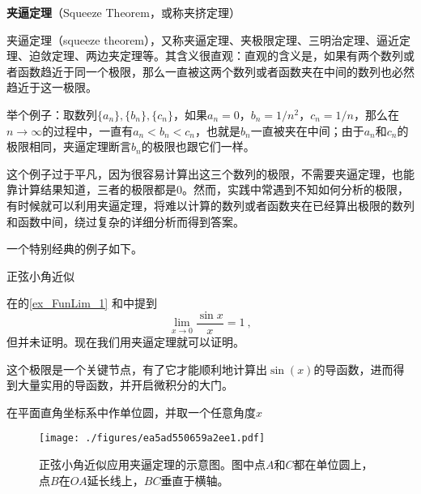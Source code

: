 
\begin{issues}
\issueDraft
\end{issues}
\textbf{夹逼定理}（Squeeze Theorem，或称夹挤定理）



夹逼定理（squeeze theorem），又称夹逼定理、夹极限定理、三明治定理、逼近定理、迫敛定理、两边夹定理等。其含义很直观：直观的含义是，如果有两个数列或者函数趋近于同一个极限，那么一直被这两个数列或者函数夹在中间的数列也必然趋近于这一极限。

举个例子：取数列$\{a_n\}, \{b_n\}, \{c_n\}$，如果$a_n=0$，$b_n=1/n^2$，$c_n=1/n$，那么在$n\to\infty$的过程中，一直有$a_n<b_n<c_n$，也就是$b_n$一直被夹在中间；由于$a_n$和$c_n$的极限相同，夹逼定理断言$b_n$的极限也跟它们一样。


这个例子过于平凡，因为很容易计算出这三个数列的极限，不需要夹逼定理，也能靠计算结果知道，三者的极限都是$0$。然而，实践中常遇到不知如何分析的极限，有时候就可以利用夹逼定理，将难以计算的数列或者函数夹在已经算出极限的数列和函数中间，绕过复杂的详细分析而得到答案。


一个特别经典的例子如下。

\begin{example}{正弦小角近似}

在的\autoref{ex_FunLim_1} 和中提到
\begin{equation}
\lim_{x\to 0}\frac{\sin x}{x}=1~, 
\end{equation}
但并未证明。现在我们用夹逼定理就可以证明。

这个极限是一个关键节点，有了它才能顺利地计算出$\sin(x)$的导函数，进而得到大量实用的导函数，并开启微积分的大门。

在平面直角坐标系中作单位圆，并取一个任意角度$x$


\begin{figure}[ht]
\centering
\texttt{[image: ./figures/ea5ad550659a2ee1.pdf]}
\caption{正弦小角近似应用夹逼定理的示意图。图中点$A$和$C$都在单位圆上，点$B$在$OA$延长线上，$BC$垂直于横轴。} \label{fig_SquzTh_1}
\end{figure}



\end{example}








